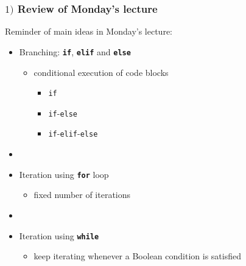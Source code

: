 \documentclass[english,14pt]{beamer}
\begin{document}
\begin{frame}[fragile]

\frametitle{$1)$ Review of Monday's lecture}

Reminder of main ideas in Monday's lecture:

\begin{itemize}
	\item Branching: \textbf{\texttt{if}}, \textbf{\texttt{elif}} and \textbf{\texttt{else}}
	\begin{itemize}
		\item conditional execution of code blocks
		\begin{itemize}
			\item \texttt{if}
			\item \texttt{if}-\texttt{else}
			\item \texttt{if}-\texttt{elif}-\texttt{else}
		\end{itemize}
	\end{itemize}
	
	\item[]
	
	\item Iteration using \textbf{\texttt{for}} loop
	\begin{itemize}
		\item fixed number of iterations
	\end{itemize}

	\item[]
	
	\item Iteration using \textbf{\texttt{while}}
		\begin{itemize}
			\item keep iterating whenever a Boolean condition is satisfied
		\end{itemize}
		
\end{itemize}

\end{frame}

\end{document}

